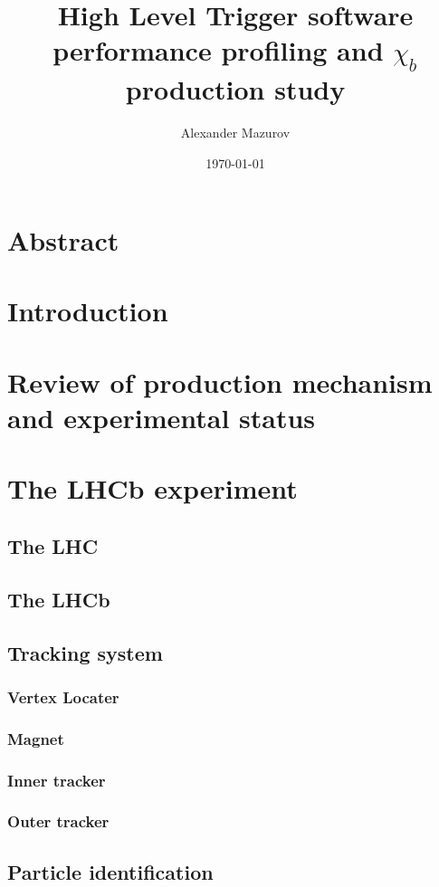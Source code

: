 \documentclass[12pt, a4paper]{article}
\title{High Level Trigger software performance profiling and $\chi_{b}$ production study}
\author{Alexander Mazurov}
\date{\today}
\begin{document}
\thispagestyle{fancyplain}
\maketitle
\section*{Abstract}

\tableofcontents
\section{Introduction}

\section{Review of production mechanism and experimental status}

\section{The LHCb experiment}

\subsection{The LHC}

\subsection{The LHCb}

\subsection{Tracking system}
\subsubsection{Vertex Locater}
\subsubsection{Magnet}
\subsubsection{Inner tracker}
\subsubsection{Outer tracker}

\subsection{Particle identification}
\end{document}
